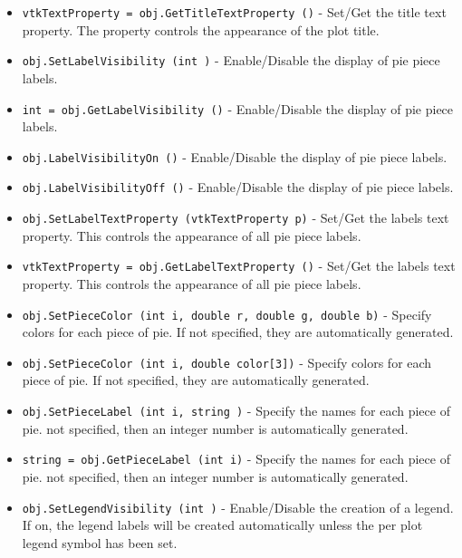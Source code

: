 \begin{itemize}
\item  \verb|vtkTextProperty = obj.GetTitleTextProperty ()| -  Set/Get the title text property. The property controls the
 appearance of the plot title.

\item  \verb|obj.SetLabelVisibility (int )| -  Enable/Disable the display of pie piece labels.

\item  \verb|int = obj.GetLabelVisibility ()| -  Enable/Disable the display of pie piece labels.

\item  \verb|obj.LabelVisibilityOn ()| -  Enable/Disable the display of pie piece labels.

\item  \verb|obj.LabelVisibilityOff ()| -  Enable/Disable the display of pie piece labels.

\item  \verb|obj.SetLabelTextProperty (vtkTextProperty p)| -  Set/Get the labels text property. This controls the appearance
 of all pie piece labels.

\item  \verb|vtkTextProperty = obj.GetLabelTextProperty ()| -  Set/Get the labels text property. This controls the appearance
 of all pie piece labels.

\item  \verb|obj.SetPieceColor (int i, double r, double g, double b)| -  Specify colors for each piece of pie. If not specified, they are 
 automatically generated.

\item  \verb|obj.SetPieceColor (int i, double color[3])| -  Specify colors for each piece of pie. If not specified, they are 
 automatically generated.

\item  \verb|obj.SetPieceLabel (int i, string )| -  Specify the names for each piece of pie.  not specified, then an integer
 number is automatically generated.

\item  \verb|string = obj.GetPieceLabel (int i)| -  Specify the names for each piece of pie.  not specified, then an integer
 number is automatically generated.

\item  \verb|obj.SetLegendVisibility (int )| -  Enable/Disable the creation of a legend. If on, the legend labels will
 be created automatically unless the per plot legend symbol has been
 set.


\end{itemize}
